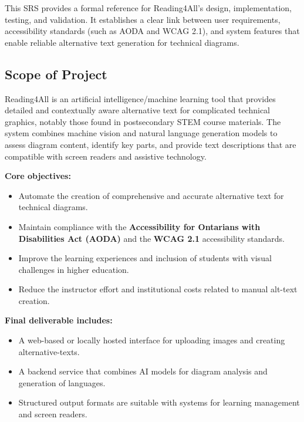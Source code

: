 \documentclass[12pt]{article}
\begin{document}
This SRS provides a formal reference for Reading4All's design,
implementation, testing, and validation. It establishes a clear link
between user requirements, accessibility standards (such as AODA and
WCAG 2.1), and system features that enable reliable alternative text
generation for technical diagrams.

\subsection{Scope of Project}
Reading4All is an artificial intelligence/machine learning tool that
provides detailed and contextually aware alternative text for
complicated technical graphics, notably those found in postsecondary
STEM course materials. The system combines machine vision and natural
language generation models to assess diagram content, identify key
parts, and provide text descriptions that are compatible with screen
readers and assistive technology.

\noindent \textbf{Core objectives:}
\begin{itemize}
  \item Automate the creation of comprehensive and accurate
    alternative text for technical diagrams.
  \item Maintain compliance with the \textbf{Accessibility for
    Ontarians with Disabilities Act (AODA)} and the \textbf{WCAG 2.1}
    accessibility standards.
  \item Improve the learning experiences and inclusion of students
    with visual challenges in higher education.
  \item Reduce the instructor effort and institutional costs related
    to manual alt-text creation.
\end{itemize}

\noindent \textbf{Final deliverable includes:}
\begin{itemize}
  \item A web-based or locally hosted interface for uploading images
    and creating alternative-texts.
  \item A backend service that combines AI models for diagram
    analysis and generation of languages.
  \item Structured output formats are suitable with systems for
    learning management and screen readers.
\end{itemize}
\end{document}
